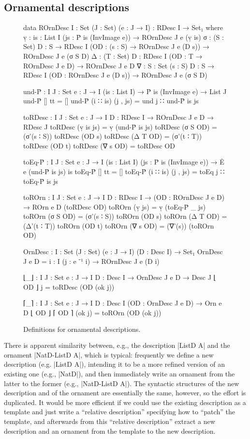\subsection{Ornamental descriptions}
\label{sec:ornamental-descriptions}

\begin{figure}
\codefigure\small
\begin{code}
data ROrnDesc {I : Set} (J : Set) (e : J → I) : RDesc I → Set₁ where
  ṿ   :  {is : List I} (js : Ṗ is (InvImage e)) → ROrnDesc J e (ṿ is)
  σ   :  (S : Set) {D : S → RDesc I}
         (OD : (s : S) → ROrnDesc J e (D s)) → ROrnDesc J e (σ S D)
  Δ   :  (T : Set) {D : RDesc I} (OD : T → ROrnDesc J e D) → ROrnDesc J e D
  ∇   :  {S : Set} (s : S) {D : S → RDesc I}
         (OD : ROrnDesc J e (D s)) → ROrnDesc J e (σ S D)

und-Ṗ : {I J : Set} {e : J → I} (is : List I) → Ṗ is (InvImage e) → List J
und-Ṗ []        tt        = []
und-Ṗ (i ∷ is)  (j , js)  = und j ∷ und-Ṗ is js

toRDesc : {I J : Set} {e : J → I} {D : RDesc I} → ROrnDesc J e D → RDesc J
toRDesc (ṿ {is} js)  = ṿ (und-Ṗ is js)
toRDesc (σ S OD)     = (σ'(s ∶ S)) toRDesc (OD s)
toRDesc (Δ T OD)     = (σ'(t ∶ T)) toRDesc (OD t)
toRDesc (∇ s OD)     = toRDesc OD

toEq-Ṗ : {I J : Set} {e : J → I} (is : List I) (js : Ṗ is (InvImage e)) → Ė e (und-Ṗ is js) is
toEq-Ṗ []        tt        = []
toEq-Ṗ (i ∷ is)  (j , js)  = toEq j ∷ toEq-Ṗ is js

toROrn :  {I J : Set} {e : J → I} {D : RDesc I} →
          (OD : ROrnDesc J e D) → ROrn e D (toRDesc OD)
toROrn (ṿ js)      = ṿ (toEq-Ṗ _ js)
toROrn (σ S OD)    = (σ'(s ∶ S)) toROrn (OD s)
toROrn (Δ T OD)    = (Δ'(t ∶ T)) toROrn (OD t)
toROrn (∇ s OD)    = (∇'(s)) (toROrn OD)

OrnDesc : {I : Set} (J : Set) (e : J → I) (D : Desc I) → Set₁
OrnDesc J e D = {i : I} (j : e ⁻¹ i) → ROrnDesc J e (D i)

⌊_⌋ : {I J : Set} {e : J → I} {D : Desc I} → OrnDesc J e D → Desc J
⌊ OD ⌋ j = toRDesc (OD (ok j))

⌈_⌉ : {I J : Set} {e : J → I} {D : Desc I} (OD : OrnDesc J e D) → Orn e D ⌊ OD ⌋
⌈ OD ⌉ (ok j) = toROrn (OD (ok j))
\end{code}
\caption{Definitions for ornamental descriptions.}
\label{fig:ornamental-descriptions}
\end{figure}

There is apparent similarity between, e.g., the description |ListD A| and the ornament |NatD-ListD A|, which is typical:
frequently we define a new description (e.g. |ListD A|), intending it to be a more refined version of an existing one (e.g., |NatD|), and then immediately write an ornament from the latter to the former (e.g., |NatD-ListD A|).
The syntactic structures of the new description and of the ornament are essentially the same, however, so the effort is duplicated.
It would be more efficient if we could use the existing description as a template and just write a ``relative description'' specifying how to ``patch'' the template, and afterwards from this ``relative description'' extract a new description and an ornament from the template to the new description.

